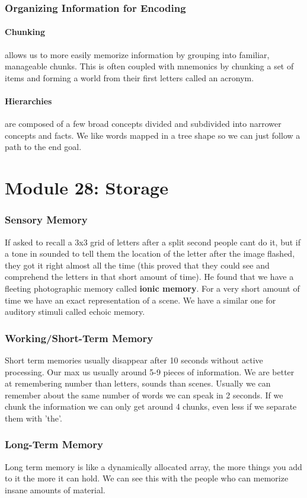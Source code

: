 \documentclass[12pt]{article}
\begin{document}
\section*{Organizing Information for Encoding}
\subsection*{Chunking} allows us to more easily memorize information by grouping into familiar, manageable chunks. This is often coupled with mnemonics by chunking a set of items and forming a world from their first letters called an acronym.
\subsection*{Hierarchies} are composed of a few broad concepts divided and subdivided into narrower concepts and facts. We like words mapped in a tree shape so we can just follow a path to the end goal. 

\part*{Module 28: Storage}
\section*{Sensory Memory}
If asked to recall a 3x3 grid of letters after a split second people cant do it, but if a tone in sounded to tell them the location of the letter after the image flashed, they got it right almost all the time (this proved that they could see and comprehend the letters in that short amount of time). He found that we have a fleeting photographic memory called \textbf{ionic memory}. For a very short amount of time we have an exact representation of a scene. We have a similar one for auditory stimuli called echoic memory. 
\section*{Working/Short-Term Memory}
Short term memories usually disappear after 10 seconds without active processing. Our max us usually around 5-9 pieces of information. We are better at remembering number than letters, sounds than scenes. Usually we can remember about the same number of words we can speak in 2 seconds. If we chunk the information we can only get around 4 chunks, even less if we separate them with 'the'.
\section*{Long-Term Memory}
Long term memory is like a dynamically allocated array, the more things you add to it the more it can hold. We can see this with the people who can memorize insane amounts of material.
\end{document}
